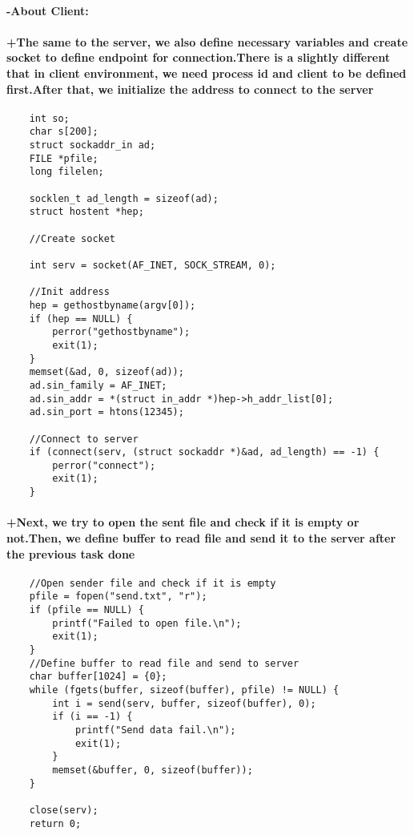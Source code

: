 \documentclass{article}
\begin{document}
\paragraph{-About Client:}
\paragraph{+The same to the server, we also define necessary variables and create socket to define endpoint for connection.There is a slightly different that in client environment, we need process id and client to be defined first.After that, we initialize the address to connect to the server}
\begin{verbatim}
    int so;
    char s[200];
    struct sockaddr_in ad;
    FILE *pfile;
    long filelen;

    socklen_t ad_length = sizeof(ad);
    struct hostent *hep;

    //Create socket

    int serv = socket(AF_INET, SOCK_STREAM, 0);

    //Init address
    hep = gethostbyname(argv[0]);
    if (hep == NULL) {
        perror("gethostbyname");
        exit(1);
    }
    memset(&ad, 0, sizeof(ad));
    ad.sin_family = AF_INET;
    ad.sin_addr = *(struct in_addr *)hep->h_addr_list[0];
    ad.sin_port = htons(12345);

    //Connect to server
    if (connect(serv, (struct sockaddr *)&ad, ad_length) == -1) {
        perror("connect");
        exit(1);
    }
\end{verbatim}

\paragraph{+Next, we try to open the sent file and check if it is empty or not.Then, we define buffer to read file and send it to the server after the previous task done}
\begin{verbatim}
    //Open sender file and check if it is empty
    pfile = fopen("send.txt", "r");
    if (pfile == NULL) {
        printf("Failed to open file.\n");
        exit(1);
    }
    //Define buffer to read file and send to server
    char buffer[1024] = {0};
    while (fgets(buffer, sizeof(buffer), pfile) != NULL) {
        int i = send(serv, buffer, sizeof(buffer), 0);
        if (i == -1) {
            printf("Send data fail.\n");
            exit(1);
        }
        memset(&buffer, 0, sizeof(buffer));
    }

    close(serv);
    return 0;
\end{verbatim}
\end{document}
